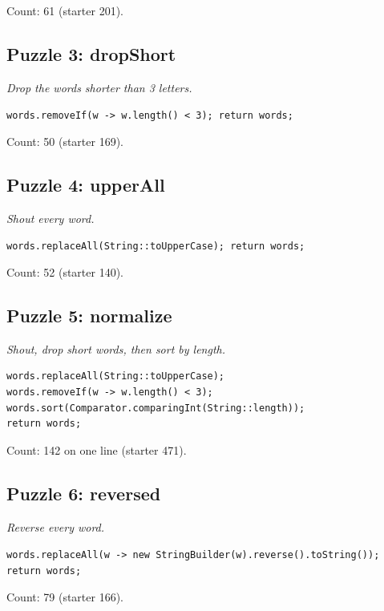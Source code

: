 \documentclass[twoside=false,DIV=14]{scrartcl}
\begin{document}
Count: 61 (starter 201).

\subsection*{Puzzle 3: dropShort}

\emph{Drop the words shorter than 3 letters.}

\lstinline{words.removeIf(w -> w.length() < 3); return words;}

Count: 50 (starter 169).

\subsection*{Puzzle 4: upperAll}

\emph{Shout every word.}

\lstinline{words.replaceAll(String::toUpperCase); return words;}

Count: 52 (starter 140).

\subsection*{Puzzle 5: normalize}

\emph{Shout, drop short words, then sort by length.}

\begin{lstlisting}
words.replaceAll(String::toUpperCase);
words.removeIf(w -> w.length() < 3);
words.sort(Comparator.comparingInt(String::length));
return words;
\end{lstlisting}

Count: 142 on one line (starter 471).

\subsection*{Puzzle 6: reversed}

\emph{Reverse every word.}

\lstinline{words.replaceAll(w -> new StringBuilder(w).reverse().toString()); return words;}

Count: 79 (starter 166).
\end{document}
